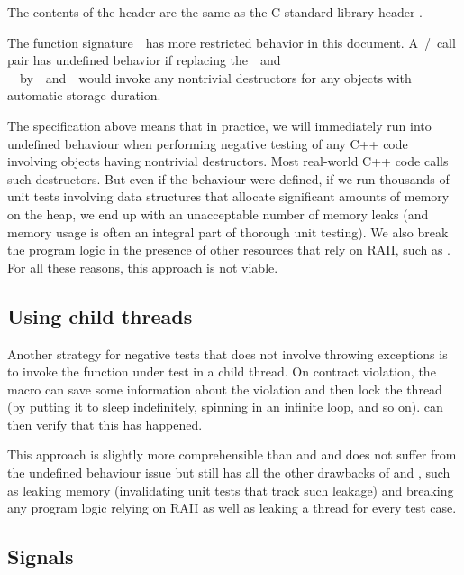 \begin{adjustwidth}{0.5cm}{0.5cm}
The contents of the header  are the same as the C standard library header .

The function signature  has more restricted behavior in this document. A / call pair has undefined behavior if replacing the  and \\  by  and  would invoke any nontrivial destructors for any objects with automatic storage duration.
\end{adjustwidth}

The specification above means that in practice, we will immediately run into undefined behaviour when performing negative testing of any C++ code involving objects having nontrivial destructors. Most real-world C++ code calls such destructors. But even if the behaviour were defined, if we run thousands of unit tests involving data structures that allocate significant amounts of memory on the heap, we end up with an unacceptable number of memory leaks (and memory usage is often an integral part of thorough unit testing). We also break the program logic in the presence of other resources that rely on RAII, such as . For all these reasons, this approach is not viable.

\subsection{Using child threads}

Another strategy for negative tests that does not involve throwing exceptions is to invoke the function under test in a child thread. On contract violation, the  macro can save some information about the violation and then lock the thread (by putting it to sleep indefinitely, spinning in an infinite loop, and so on).  can then verify that this has happened.

This approach is slightly more comprehensible than  and  and does not suffer from the undefined behaviour issue but still has all the other drawbacks of  and , such as leaking memory (invalidating unit tests that track such leakage) and breaking any program logic relying on RAII as well as leaking a thread for every test case.


\subsection{Signals}

